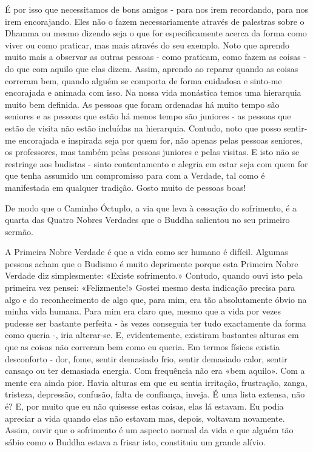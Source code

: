É por isso que necessitamos de bons amigos - para nos irem recordando,
para nos irem encorajando. Eles não o fazem necessariamente através de
palestras sobre o Dhamma ou mesmo dizendo seja o que for especificamente
acerca da forma como viver ou como praticar, mas mais através do seu
exemplo. Noto que aprendo muito mais a observar as outras pessoas - como
praticam, como fazem as coisas - do que com aquilo que elas dizem.
Assim, aprendo ao reparar quando as coisas correram bem, quando alguém
se comporta de forma cuidadosa e sinto-me encorajada e animada com isso.
Na nossa vida monástica temos uma hierarquia muito bem definida. As
pessoas que foram ordenadas há muito tempo são seniores e as pessoas que
estão há menos tempo são juniores - as pessoas que estão de visita não
estão incluídas na hierarquia. Contudo, noto que posso sentir-me
encorajada e inspirada seja por quem for, não apenas pelas pessoas
seniores, os professores, mas também pelas pessoas juniores e pelas
visitas. E isto não se restringe aos budistas - sinto contentamento e
alegria em estar seja com quem for que tenha assumido um compromisso
para com a Verdade, tal como é manifestada em qualquer tradição. Gosto
muito de pessoas boas!

De modo que o Caminho Óctuplo, a via que leva à cessação do sofrimento,
é a quarta das Quatro Nobres Verdades que o Buddha salientou no seu
primeiro sermão.

A Primeira Nobre Verdade é que a vida como ser humano é difícil. Algumas
pessoas acham que o Budismo é muito deprimente porque esta Primeira
Nobre Verdade diz simplesmente: «Existe sofrimento.» Contudo, quando
ouvi isto pela primeira vez pensei: «Felizmente!» Gostei mesmo desta
indicação precisa para algo e do reconhecimento de algo que, para mim,
era tão absolutamente óbvio na minha vida humana. Para mim era claro
que, mesmo que a vida por vezes pudesse ser bastante perfeita - às vezes
conseguia ter tudo exactamente da forma como queria -, iria alterar-se.
E, evidentemente, existiram bastantes alturas em que as coisas não
correram bem como eu queria. Em termos físicos existia desconforto -
dor, fome, sentir demasiado frio, sentir demasiado calor, sentir cansaço
ou ter demasiada energia. Com frequência não era «bem aquilo». Com a
mente era ainda pior. Havia alturas em que eu sentia irritação,
frustração, zanga, tristeza, depressão, confusão, falta de confiança,
inveja. É uma lista extensa, não é? E, por muito que eu não quisesse
estas coisas, elas lá estavam. Eu podia apreciar a vida quando elas não
estavam mas, depois, voltavam novamente. Assim, ouvir que o sofrimento é
um aspecto normal da vida e que alguém tão sábio como o Buddha estava a
frisar isto, constituiu um grande alívio.

